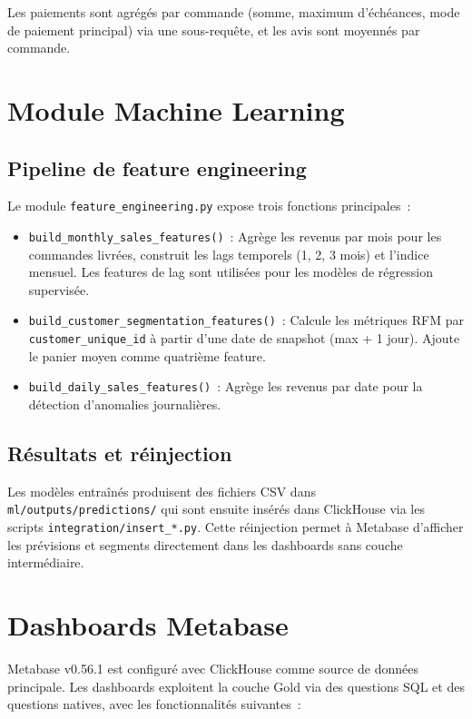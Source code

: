 Les paiements sont agrégés par commande (somme, maximum d'échéances, mode de paiement principal) via une sous-requête, et les avis sont moyennés par commande.

\section{Module Machine Learning}

\subsection{Pipeline de feature engineering}

Le module \texttt{feature\_engineering.py} expose trois fonctions principales~:

\begin{itemize}
  \setlength{\itemsep}{0.4em}
  \item \texttt{build\_monthly\_sales\_features()}~: Agrège les revenus par mois pour les commandes livrées, construit les lags temporels (1, 2, 3 mois) et l'indice mensuel. Les features de lag sont utilisées pour les modèles de régression supervisée.
  \item \texttt{build\_customer\_segmentation\_features()}~: Calcule les métriques RFM par \texttt{customer\_unique\_id} à partir d'une date de snapshot (max + 1 jour). Ajoute le panier moyen comme quatrième feature.
  \item \texttt{build\_daily\_sales\_features()}~: Agrège les revenus par date pour la détection d'anomalies journalières.
\end{itemize}

\subsection{Résultats et réinjection}

Les modèles entraînés produisent des fichiers CSV dans \texttt{ml/outputs/predictions/} qui sont ensuite insérés dans ClickHouse via les scripts \texttt{integration/insert\_*.py}. Cette réinjection permet à Metabase d'afficher les prévisions et segments directement dans les dashboards sans couche intermédiaire.

\section{Dashboards Metabase}

Metabase v0.56.1 est configuré avec ClickHouse comme source de données principale. Les dashboards exploitent la couche Gold via des questions SQL et des questions natives, avec les fonctionnalités suivantes~:

